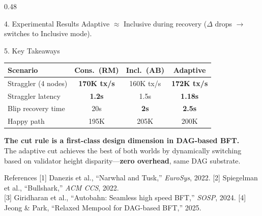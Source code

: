 \documentclass[final]{beamer}
\begin{document}
\begin{frame}[t]
\begin{columns}[T]
\begin{column}{0.48\textwidth}
\begin{block}{4. Experimental Results}
\vspace{0.2cm}
Adaptive $\approx$ Inclusive during recovery ($\Delta$ drops $\rightarrow$ switches to Inclusive mode).
\end{block}

\vspace{1cm}

\begin{alertblock}{5. Key Takeaways}
\large

\vspace{0.5cm}
\begin{center}
\begin{tabular}{@{}lccc@{}}
\toprule
\textbf{Scenario} & \textbf{Cons.\ (RM)} & \textbf{Incl.\ (AB)} & \textbf{Adaptive} \\
\midrule
Straggler (4 nodes) & \textcolor{green!50!black}{\textbf{170K tx/s}} & 160K tx/s & \textcolor{green!50!black}{\textbf{172K tx/s}} \\
Straggler latency   & \textcolor{green!50!black}{\textbf{1.2s}} & 1.5s & \textcolor{green!50!black}{\textbf{1.18s}} \\
Blip recovery time  & 20s & \textcolor{green!50!black}{\textbf{2s}} & \textcolor{green!50!black}{\textbf{2.5s}} \\
Happy path          & 195K & 205K & 200K \\
\bottomrule
\end{tabular}
\end{center}

\vspace{0.5cm}
\textbf{The cut rule is a first-class design dimension in DAG-based BFT.}\\
The adaptive cut achieves the best of both worlds by dynamically switching based on validator height disparity---\textbf{zero overhead}, same DAG substrate.

\vspace{0.5cm}
\end{alertblock}

\vspace{1cm}

\begin{block}{References}
\normalsize
{[1]} Danezis et al., ``Narwhal and Tusk,'' \emph{EuroSys}, 2022.\quad
{[2]} Spiegelman et al., ``Bullshark,'' \emph{ACM CCS}, 2022.\\
{[3]} Giridharan et al., ``Autobahn: Seamless high speed BFT,'' \emph{SOSP}, 2024.\quad
{[4]} Jeong \& Park, ``Relaxed Mempool for DAG-based BFT,'' 2025.
\end{block}

\end{column}
\end{columns}

\end{frame}
\end{document}
